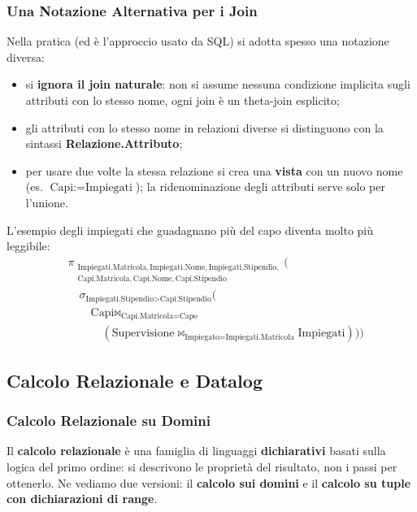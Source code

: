 \documentclass[12pt]{extarticle}
\begin{document}
\subsubsection{Una Notazione Alternativa per i Join}
\noindent Nella pratica (ed è l'approccio usato da SQL) si adotta spesso una notazione diversa:
\begin{itemize}
    \item si \textbf{ignora il join naturale}: non si assume nessuna condizione implicita sugli attributi con lo stesso nome, ogni join è un theta-join esplicito;
    \item gli attributi con lo stesso nome in relazioni diverse si distinguono con la sintassi \textbf{Relazione.Attributo};
    \item per usare due volte la stessa relazione si crea una \textbf{vista} con un nuovo nome (es. $\text{Capi} := \text{Impiegati}$); la ridenominazione degli attributi serve solo per l'unione.
\end{itemize}
L'esempio degli impiegati che guadagnano più del capo diventa molto più leggibile:
\[
\begin{aligned}
& \pi_{\substack{\text{Impiegati.Matricola}, \text{Impiegati.Nome}, \text{Impiegati.Stipendio}, \\ \text{Capi.Matricola}, \text{Capi.Nome}, \text{Capi.Stipendio}}}\Big( \\
& \quad \sigma_{\text{Impiegati.Stipendio} > \text{Capi.Stipendio}}\Big( \\
& \qquad \text{Capi} \bowtie_{\text{Capi.Matricola} = \text{Capo}} \\
& \qquad\quad (\text{Supervisione} \bowtie_{\text{Impiegato} = \text{Impiegati.Matricola}} \text{Impiegati})
\Big)\Big)
\end{aligned}
\]

\newpage

\subsection{Calcolo Relazionale e Datalog}

\subsubsection{Calcolo Relazionale su Domini}
\noindent Il \textbf{calcolo relazionale} è una famiglia di linguaggi \textbf{dichiarativi} basati sulla logica del primo ordine: si descrivono le proprietà del risultato, non i passi per ottenerlo. Ne vediamo due versioni: il \textbf{calcolo sui domini} e il \textbf{calcolo su tuple con dichiarazioni di range}.
\end{document}

